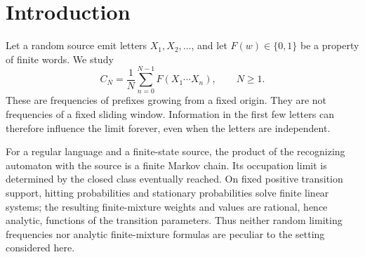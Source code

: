 \documentclass[11pt]{article}
\theoremstyle{definition}
\theoremstyle{remark}
\begin{document}
\begin{abstract}
Consider Boolean combinations of polynomial zero tests of finitely represented scalar word functions over a commutative ring. Along a finite-state labelled source, the frequency of the event among chronological prefixes can converge to a random value. We identify that value from a finite initial boundary: on an independent-selector realization of the source, it is determined by the word preceding the first occurrence of a fixed aligned marker. The marker is common to all positive edge weights on a fixed source support. The limiting law is consequently a countable mixture whose weights and branch values are real analytic in those weights. The same boundary represents finite joint laws; all mixed moments are analytic, and the joint exponential transform is locally holomorphic in complexified source parameters and entire in its transform variables. No irreducibility, stationary start, field hypothesis, or invertibility of the original matrices is required. A four-dimensional integer example has infinitely many distinct limiting values, separating this conclusion from finite-state occupation laws. The argument combines finite-module compression, stable group means, and an exact initial-boundary identification; a Lean development verifies the core law and analytic-transform statements.
\end{abstract}

\section{Introduction}
Let a random source emit letters $X_1,X_2,\ldots$, and let $F(w)\in\{0,1\}$ be a property of finite words. We study
\begin{equation}\label{eq:frequency}
 C_N=\frac1N\sum_{n=0}^{N-1}F(X_1\cdots X_n),\qquad N\geq1.
\end{equation}
These are frequencies of prefixes growing from a fixed origin. They are not frequencies of a fixed sliding window. Information in the first few letters can therefore influence the limit forever, even when the letters are independent.

For a regular language and a finite-state source, the product of the recognizing automaton with the source is a finite Markov chain. Its occupation limit is determined by the closed class eventually reached. On fixed positive transition support, hitting probabilities and stationary probabilities solve finite linear systems; the resulting finite-mixture weights and values are rational, hence analytic, functions of the transition parameters. Thus neither random limiting frequencies nor analytic finite-mixture formulas are peculiar to the setting considered here.
\end{document}
